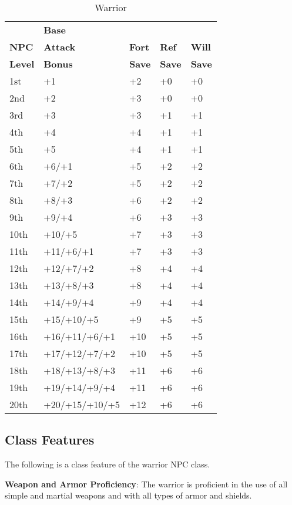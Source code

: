 \begin{table}[]
\sffamily
\caption{Warrior}
\begin{tabular}{lllll}
& \textbf{Base} \\
\textbf{NPC}   & \textbf{Attack} & \textbf{Fort} & \textbf{Ref} & \textbf{Will}\\
\textbf{Level} & \textbf{Bonus} & \textbf{Save} & \textbf{Save} & \textbf{Save}\\
1st & +1 & +2 & +0 & +0\\
2nd & +2 & +3 & +0 & +0\\
3rd & +3 & +3 & +1 & +1\\
4th & +4 & +4 & +1 & +1\\
5th & +5 & +4 & +1 & +1\\
6th & +6/+1 & +5 & +2 & +2\\
7th & +7/+2 & +5 & +2 & +2\\
8th & +8/+3 & +6 & +2 & +2\\
9th & +9/+4 & +6 & +3 & +3\\
10th & +10/+5 & +7 & +3 & +3\\
11th & +11/+6/+1 & +7 & +3 & +3\\
12th & +12/+7/+2 & +8 & +4 & +4\\
13th & +13/+8/+3 & +8 & +4 & +4\\
14th & +14/+9/+4 & +9 & +4 & +4\\
15th & +15/+10/+5 & +9 & +5 & +5\\
16th & +16/+11/+6/+1 & +10 & +5 & +5\\
17th & +17/+12/+7/+2 & +10 & +5 & +5\\
18th & +18/+13/+8/+3 & +11 & +6 & +6\\
19th & +19/+14/+9/+4 & +11 & +6 & +6\\
20th & +20/+15/+10/+5 & +12 & +6 & +6\\
\end{tabular}
\end{table}

				
\subsection{Class Features}

				
The following is a class feature of the warrior NPC class.
				
\textbf{Weapon and Armor Proficiency}: The warrior is proficient in the use of all simple and martial weapons and with all types of armor and shields.
        	
